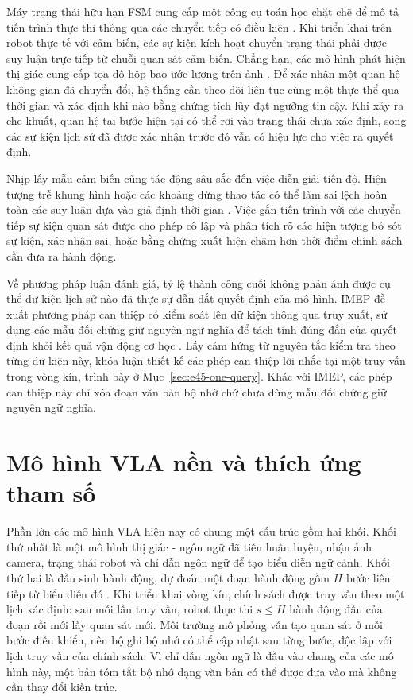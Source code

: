 Máy trạng thái hữu hạn FSM cung cấp một công cụ toán học chặt chẽ để mô tả tiến trình thực thi thông qua các chuyển tiếp có điều kiện \cite{rewardmachines2018}. Khi triển khai trên robot thực tế với cảm biến, các sự kiện kích hoạt chuyển trạng thái phải được suy luận trực tiếp từ chuỗi quan sát cảm biến. Chẳng hạn, các mô hình phát hiện thị giác cung cấp tọa độ hộp bao ước lượng trên ảnh \cite{groundingdino2024}. Để xác nhận một quan hệ không gian đã chuyển đổi, hệ thống cần theo dõi liên tục cùng một thực thể qua thời gian và xác định khi nào bằng chứng tích lũy đạt ngưỡng tin cậy. Khi xảy ra che khuất, quan hệ tại bước hiện tại có thể rơi vào trạng thái chưa xác định, song các sự kiện lịch sử đã được xác nhận trước đó vẫn có hiệu lực cho việc ra quyết định.

Nhịp lấy mẫu cảm biến cũng tác động sâu sắc đến việc diễn giải tiến độ. Hiện tượng trễ khung hình hoặc các khoảng dừng thao tác có thể làm sai lệch hoàn toàn các suy luận dựa vào giả định thời gian \cite{clockvla2026}. Việc gắn tiến trình với các chuyển tiếp sự kiện quan sát được cho phép cô lập và phân tích rõ các hiện tượng bỏ sót sự kiện, xác nhận sai, hoặc bằng chứng xuất hiện chậm hơn thời điểm chính sách cần đưa ra hành động.

Về phương pháp luận đánh giá, tỷ lệ thành công cuối không phản ánh được cụ thể dữ kiện lịch sử nào đã thực sự dẫn dắt quyết định của mô hình. IMEP đề xuất phương pháp can thiệp có kiểm soát lên dữ kiện thông qua truy xuất, sử dụng các mẫu đối chứng giữ nguyên ngữ nghĩa để tách tính đúng đắn của quyết định khỏi kết quả vận động cơ học \cite{imep2026}. Lấy cảm hứng từ nguyên tắc kiểm tra theo từng dữ kiện này, khóa luận thiết kế các phép can thiệp lời nhắc tại một truy vấn trong vòng kín, trình bày ở Mục~\ref{sec:e45-one-query}. Khác với IMEP, các phép can thiệp này chỉ xóa đoạn văn bản bộ nhớ chứ chưa dùng mẫu đối chứng giữ nguyên ngữ nghĩa.

\section{Mô hình VLA nền và thích ứng tham số}
\label{sec:vla-backbones}

Phần lớn các mô hình VLA hiện nay có chung một cấu trúc gồm hai khối. Khối thứ nhất là một mô hình thị giác - ngôn ngữ đã tiền huấn luyện, nhận ảnh camera, trạng thái robot và chỉ dẫn ngôn ngữ để tạo biểu diễn ngữ cảnh. Khối thứ hai là đầu sinh hành động, dự đoán một đoạn hành động gồm $H$ bước liên tiếp từ biểu diễn đó \cite{rt22023,openvla2024,octo2024}. Khi triển khai vòng kín, chính sách được truy vấn theo một lịch xác định: sau mỗi lần truy vấn, robot thực thi $s \le H$ hành động đầu của đoạn rồi mới lấy quan sát mới. Môi trường mô phỏng vẫn tạo quan sát ở mỗi bước điều khiển, nên bộ ghi bộ nhớ có thể cập nhật sau từng bước, độc lập với lịch truy vấn của chính sách. Vì chỉ dẫn ngôn ngữ là đầu vào chung của các mô hình này, một bản tóm tắt bộ nhớ dạng văn bản có thể được đưa vào mà không cần thay đổi kiến trúc.

